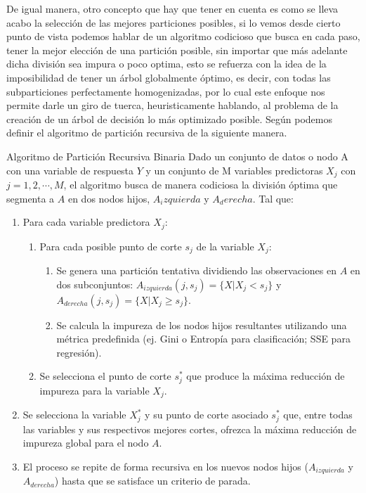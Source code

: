 De igual manera, otro concepto que hay que tener en cuenta es como se lleva acabo la selección de las mejores particiones posibles, si lo vemos desde cierto punto de vista podemos hablar de un algoritmo codicioso que busca en cada paso, tener la mejor elección de una partición posible, sin importar que más adelante dicha división sea impura o poco optima, esto se refuerza con la idea de la imposibilidad de tener un árbol globalmente óptimo, es decir, con todas las subparticiones perfectamente homogenizadas, por lo cual este enfoque nos permite darle un giro de tuerca, heuristicamente hablando, al problema de la creación de un árbol de decisión lo más optimizado posible. Según \cite{EstadisticaPracticacd} podemos definir el algoritmo de partición recursiva de la siguiente manera.

\begin{definicion}{Algoritmo de Partición Recursiva Binaria}
	Dado un conjunto de datos o nodo A con una variable de respuesta $Y$ y un conjunto de M variables predictoras $X_j$ con $j=1,2,\cdots,M$, el algoritmo busca de manera codiciosa la división óptima que segmenta a $A$ en dos nodos hijos, $A_izquierda$ y $A_derecha$. Tal que:
	
	\begin{enumerate}
		\item Para cada variable predictora $X_j$:
		\begin{enumerate}
			\item[a] Para cada posible punto de corte $s_j$ de la variable $X_j$:
			\begin{enumerate}
				\item[i] Se genera una partición tentativa dividiendo las observaciones en $A$ en dos subconjuntos: $A_{izquierda}(j, s_j) = \{X | X_j < s_j\}$ y $A_{derecha}(j, s_j) = \{X | X_j \geq s_j\}$.
				\item[ii] Se calcula la impureza de los nodos hijos resultantes utilizando una métrica predefinida (ej. Gini o Entropía para clasificación; SSE para regresión).
			\end{enumerate}
			\item[b] Se selecciona el punto de corte $s_j^*$ que produce la máxima reducción de impureza para la variable $X_j$.
		\end{enumerate}
		\item Se selecciona la variable $X_j^*$ y su punto de corte asociado $s_j^*$ que, entre todas las variables y sus respectivos mejores cortes, ofrezca la máxima reducción de impureza global para el nodo $A$.
		\item El proceso se repite de forma recursiva en los nuevos nodos hijos ($A_{izquierda}$ y $A_{derecha}$) hasta que se satisface un criterio de parada.
	\end{enumerate}
\end{definicion}

